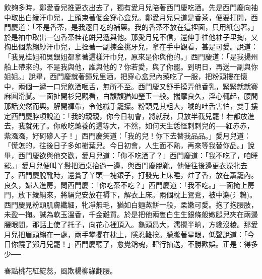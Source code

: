 飲夠多時，鄭愛香兒推更衣出去了，獨有愛月兒陪著西門慶吃酒。先是西門慶向袖中取出白綾汗巾兒，上頭束著個金穿心盒兒。鄭愛月兒只道是香茶，便要打開，西門慶道：「不是香茶，是我逐日吃的補藥。我的香茶不放在這裡面，只用紙包著。」於是袖中取出一包香茶桂花餅兒遞與他。那愛月兒不信，還伸手往他袖子里掏，又掏出個紫縐紗汗巾兒，上拴著一副揀金挑牙兒，拿在手中觀看，甚是可愛。說道：「我見桂姐和吳銀姐都拿著這樣汗巾兒，原來是你與他的。」西門慶道：「是我揚州船上帶來的。不是我與他，誰與他的？你若愛，與了你罷。到明日，再送一副與你姐姐。」說畢，西門慶就著鐘兒里酒，把穿心盒兒內藥吃了一服，把粉頭摟在懷中，兩個一遞一口兒飲酒咂舌，無所不至。西門慶又舒手摸弄他香乳，緊緊就就賽麻圓滑膩。一面扯開衫兒觀看，白馥馥猶如瑩玉一般。揣摩良久，淫心輒起，腰間那話突然而興。解開褲帶，令他纖手籠攥。粉頭見其粗大，唬的吐舌害怕，雙手摟定西門慶脖項說道：「我的親親，你今日初會，將就我，只放半截兒罷！若都放進去，我就死了。你敢吃藥養的這等大，不然，如何天生恁怪剌剌兒的──紅赤赤，紫漒漒，好砢磣人子！」西門慶笑道：「我的兒！你下去替我品品。」愛月兒道：「慌怎的，往後日子多如樹葉兒。今日初會，人生面不熟，再來等我替你品。」說畢，西門慶欲與他交歡，愛月兒道：「你不吃酒了？」西門慶道：「我不吃了，咱睡罷。」愛月兒便叫丫鬟把酒桌抬過一邊，與西門慶脫靴，他便往後邊更衣澡牝去了。西門慶脫靴時，還賞了丫頭一塊銀子，打發先上床睡，炷了香，放在薰籠內。良久，婦人進房，問西門慶：「你吃茶不吃？」西門慶道：「我不吃。」一面掩上房門，放下綾綃來，將絹兒安放在褥下，解衣上床。兩個枕上鴛鴦，被中鸂(氵鵣)。西門慶見粉頭肌膚纖細，牝凈無毛，猶如白麵蒸餅一般，柔嫩可愛。抱了抱腰肢，未盈一掬。誠為軟玉溫香，千金難買。於是把他兩隻白生生銀條般嫩腿兒夾在兩邊腰眼間，那話上使了托子，向花心裡頂入。龜頭昂大，濡攪半晌，方纔沒棱。那愛月兒把眉頭縐在一處，兩手攀擱在枕上，隱忍難挨。朦朧著星眼，低聲說道：「今日你饒了鄭月兒罷！」西門慶聽了，愈覺銷魂，肆行抽送，不勝歡娛。正是：得多少──

春點桃花紅綻蕊，風欺楊柳綠翻腰。

